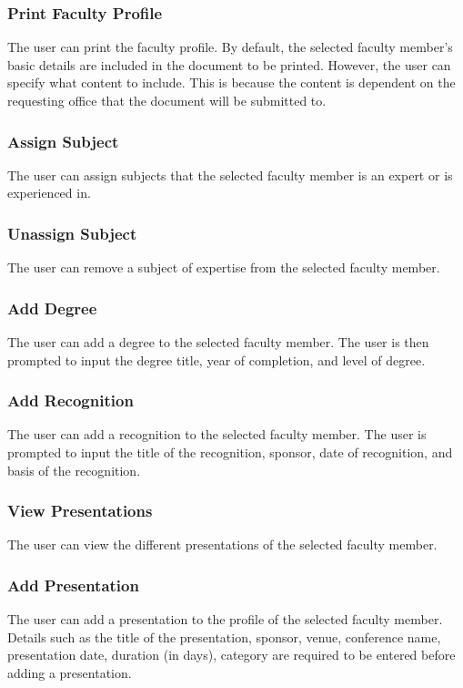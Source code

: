     	\subsubsection{Print Faculty Profile}
    	The user can print the faculty profile. By default, the selected faculty member's basic details are included in the document to be printed. However, the user can specify what content to include. This is because the content is dependent on the requesting office that the document will be submitted to.
    	
    	\subsubsection{Assign Subject}
    	The user can assign subjects that the selected faculty member is an expert or is experienced in.
    	
    	\subsubsection{Unassign Subject}
    	The user can remove a subject of expertise from the selected faculty member.
    	
    	\subsubsection{Add Degree}
    	The user can add a degree to the selected faculty member. The user is then prompted to input the degree title, year of completion, and level of degree.
    	
    	\subsubsection{Add Recognition}
    	The user can add a recognition to the selected faculty member. The user is prompted to input the title of the recognition, sponsor, date of recognition, and basis of the recognition.
    	
    	\subsubsection{View Presentations}
    	The user can view the different presentations of the selected faculty member.
    	
    	\subsubsection{Add Presentation}
    	The user can add a presentation to the profile of the selected faculty member. Details such as the title of the presentation, sponsor, venue, conference name, presentation date, duration (in days), category are required to be entered before adding a presentation.
    	

